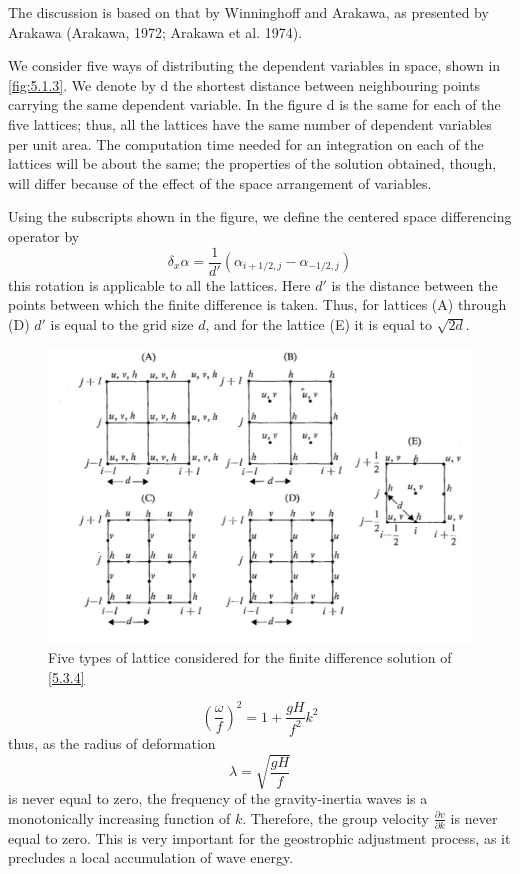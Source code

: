 The discussion is based on that by Winninghoff and Arakawa, as presented by Arakawa (Arakawa, 1972; Arakawa et al. 1974).

We consider five ways of distributing the dependent variables in space, shown in \ref{fig:5.1.3}. We denote by d the shortest distance between neighbouring points carrying the same dependent variable. In the figure d is the same for each of the five lattices; thus, all the lattices have the same number of dependent variables per unit area. The computation time needed for an integration on each of the lattices will be about the same; the properties of the solution obtained, though, will differ because of the effect of the space arrangement of variables.

Using the subscripts shown in the figure, we define the centered space differencing operator by
\begin{equation}
    \delta_x\alpha=\frac{1}{d'}\left(\alpha_{i+1/2, j}-\alpha_{-1/2,j}\right)
\end{equation}
this rotation is applicable to all the lattices. Here $d'$ is the distance between the points between which the finite difference is taken. Thus, for lattices (A) through (D) $d'$ is equal to the grid size $d$, and for the lattice (E) it is equal to $\sqrt{2d}$.\begin{figure}[h]
    \centering
    \includegraphics[width=0.5\linewidth]{uploads/Screenshot 2024-11-14 122636.png}
    \caption{Five types of lattice considered for the finite difference solution of \ref{5.3.4}}
    \label{fig:5.3.1}
\end{figure}
\begin{equation}\label{5.3.11}
    \left(\frac{\omega}{f}\right)^2=1+\frac{gH}{f^2}k^2
\end{equation}
thus, as the radius of deformation $$\lambda=\sqrt{\frac{gH}{f}}$$ is never equal to zero, the frequency of the gravity-inertia waves is a monotonically increasing function of $k$. Therefore, the group velocity $\frac{\partial v}{\partial k}$ is never equal to zero. This is very important for the geostrophic adjustment process, as it precludes a local accumulation of wave energy.

